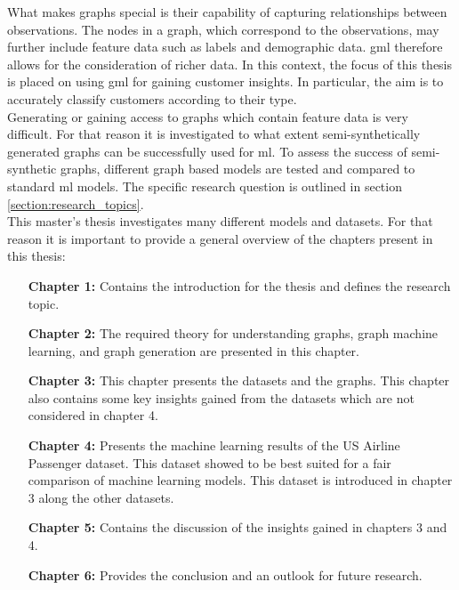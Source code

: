 	\noindent What makes graphs special is their capability of capturing
	relationships between observations. The nodes in a graph, which correspond
	to the observations, may further include feature data such as labels and
	demographic data. \Acl{gml} therefore allows for the
	consideration of richer data. In this context, the focus of this thesis is 
	placed on using \acs{gml} for gaining customer insights. In
	particular, the aim is to accurately classify customers according to their
	type. \\

	\noindent Generating or gaining access to graphs which contain feature data 
	is very difficult. For that reason it is investigated to what extent
	semi-synthetically generated graphs can be successfully used for \ac{ml}. 
	To assess the success of semi-synthetic graphs, different graph based models 
	are tested and compared to standard \acs{ml} models. The specific 
	research question is outlined in section \ref{section:research_topics}. \\

	\noindent This master's thesis investigates many different models and
	datasets. For that reason it is important to provide a general overview of
	the chapters present in this thesis:

	\begin{itemize}[leftmargin=1.0in] 
		\item[\textbf{Chapter 1:}] Contains the introduction for the thesis and defines
			the research topic.
		\item[\textbf{Chapter 2:}] The required theory for understanding
			graphs, graph machine learning, and graph generation are presented
			in this chapter.
		\item[\textbf{Chapter 3:}] This chapter presents the datasets and the graphs.
			This chapter also contains some key insights gained from the 
			datasets which are not considered in chapter 4.
		\item[\textbf{Chapter 4:}] Presents the machine learning results of the US Airline 
			Passenger dataset. This dataset showed to be best suited for a
			fair comparison of machine learning models. This dataset is 
			introduced in chapter 3 along the other datasets.
		\item[\textbf{Chapter 5:}]  Contains the discussion of the insights gained in
			chapters 3 and 4.
		\item[\textbf{Chapter 6:}] Provides the conclusion and an outlook for future
			research.
	\end{itemize}

